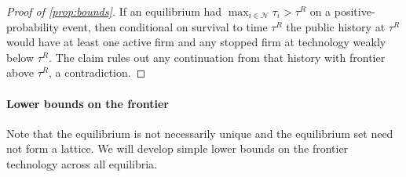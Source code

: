 \documentclass[12pt,reqno]{article}
\newcommand{\SPE}{\ensuremath{\mathsf{SPE}}}
\theoremstyle{definition} \newtheorem{example}{Example}
\theoremstyle{definition} \newtheorem{condition}{Condition}
\theoremstyle{definition} \newtheorem{corollary}{Corollary}
\theoremstyle{definition} \newtheorem{claim}{Claim}
\theoremstyle{definition} \newtheorem{definition}{Definition}
\theoremstyle{definition} \newtheorem{conjecture}{Conjecture}
\theoremstyle{definition} \newtheorem{Lemma}{Lemma}
\theoremstyle{definition} \newtheorem{lemma}{Lemma}
\theoremstyle{plain} \newtheorem{theorem}{Theorem}
\theoremstyle{definition} \newtheorem{assumption}{Assumption}
\theoremstyle{definition} \newtheorem*{assumptionnonumber}{Assumption}
\theoremstyle{definition} \newtheorem*{theoremNoNumber}{Proposition}
\theoremstyle{definition}
\theoremstyle{definition}\newtheorem{proposition}{Proposition}
\theoremstyle{definition} \newtheorem{result}{Result}
\theoremstyle{definition} \newtheorem*{definitionNoNumber}{Definition}
\theoremstyle{definition} \newtheorem{Definition}{Definition}
\theoremstyle{definition} \newtheorem*{DefinitionNoNumber}{Definition}
\theoremstyle{definition} \newtheorem*{fact}{Fact}
\theoremstyle{definition} \newtheorem*{property}{Property}
\theoremstyle{definition} \newtheorem{remark}{Remark}
\begin{document}
\begin{proof}[Proof of \cref{prop:bounds}]

If an equilibrium had $\max_{i\in\mathcal N}\tau_i>\tau^R$ on a positive-probability event, then conditional on survival to time $\tau^R$ the public history at $\tau^R$ would have at least one active firm and any stopped firm at technology weakly below $\tau^R$. The claim rules out any continuation from that history with frontier above $\tau^R$, a contradiction.
\end{proof}




\paragraph{Lower bounds on the frontier} Note that the equilibrium is not necessarily unique and the equilibrium set need not form a lattice. We will develop simple lower bounds on the frontier technology across all equilibria. 
\end{document}
